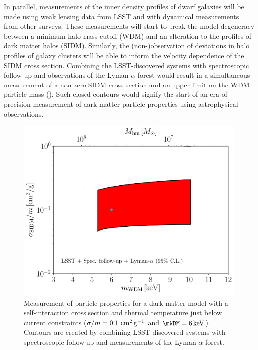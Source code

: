 In parallel, measurements of the inner density profiles of dwarf galaxies will be made using weak lensing data from LSST and with dynamical measurements from other surveys.
These measurements will start to break the model degeneracy between a minimum halo mass cutoff (\eg WDM) and an alteration to the profiles of dark matter halos (\eg SIDM).
Similarly, the (non-)observation of deviations in halo profiles of galaxy clusters will be able to inform the velocity dependence of the SIDM cross section.
Combining the LSST-discovered systems with spectroscopic follow-up and observations of the Lyman-$\alpha$ forest would result in a simultaneous measurement of a non-zero SIDM cross section and an upper limit on the WDM particle mass (\citep{sidm_wdm_disc}).
Such closed contours would signify the start of an era of precision measurement of dark matter particle properties using astrophysical observations.

\begin{figure}
\centering
\includegraphics[width=0.6\columnwidth]{figures/SIDM_WDM_fig_disc.pdf}
\caption{\label{fig:sidm_wdm_disc} Measurement of particle properties for a dark matter model with a self-interaction cross section and thermal temperature just below current constraints ($\sigma/m = 0.1 \mathrm{\,\mathrm{\,cm}^2\mathrm{\,g}^{-1}}$ and $\mWDM = 6\keV$). Contours are created by combining LSST-discovered systems with spectroscopic follow-up and measurements of the Lyman-$\alpha$ forest.
 
}
\end{figure}


